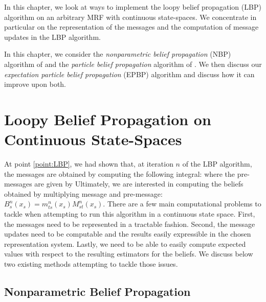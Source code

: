 
In this chapter, we look at ways to implement the loopy belief propagation (LBP) algorithm on an arbitrary MRF with continuous state-spaces. We concentrate in particular on the representation of the messages and the computation of message updates in the LBP algorithm. 

In this chapter, we consider the \emph{nonparametric belief propagation} (NBP) algorithm of \citet{sudderth03} and the \emph{particle belief propagation} algorithm of \citet{ihler09}. We then discuss our \emph{expectation particle belief propagation} (EPBP) algorithm \citep{lienart15} and discuss how it can improve upon both. 

\section{\label{sec:LBPonCS}Loopy Belief Propagation on Continuous State-Spaces}
At point \ref{point:LBP}, we had shown that, at iteration $n$ of the LBP algorithm, the messages are obtained by computing the following integral:
where the pre-messages are given by 
Ultimately, we are interested in computing the beliefs obtained by multiplying message and pre-message: $B_{s}^{n}(x_{s}) = m^{n}_{ts}(x_{s})M^{n}_{st}(x_{s})$. There are a few main computational problems to tackle when attempting to run this algorithm in a continuous state space. First, the messages need to be represented in a tractable fashion. Second, the message updates need to be computable and the results easily expressible in the chosen representation system. Lastly, we need to be able to easily compute expected values with respect to the resulting estimators for the beliefs. We discuss below two existing methods attempting to tackle those issues.
\subsection{Nonparametric Belief Propagation}

